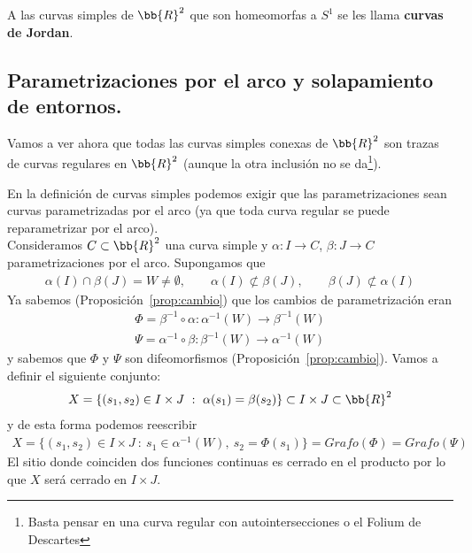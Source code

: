 \begin{definicion}
    A las curvas simples de $\bb{R}^2$ que son homeomorfas a $S^1$ se les llama \textbf{curvas de Jordan}.
\end{definicion}

\subsection{Parametrizaciones por el arco y solapamiento de entornos.}

Vamos a ver ahora que todas las curvas simples conexas de $\bb{R}^2$ son trazas de curvas regulares en $\bb{R}^2$ (aunque la otra inclusión no se da\footnote{Basta pensar en una curva regular con autointersecciones o el Folium de Descartes}).

\begin{observacion}
    En la definición de curvas simples podemos exigir que las parametrizaciones sean curvas parametrizadas por el arco (ya que toda curva regular se puede reparametrizar por el arco).\\

    Consideramos $C\subset \bb{R}^2$ una curva simple y $\alpha:I \to C$, $\beta: J \to C$ parametrizaciones por el arco. Supongamos que
    \begin{gather*}
        \alpha(I)\cap \beta(J)=W\neq \emptyset, \qquad \alpha(I)\not\subset\beta(J), \qquad \beta(J)\not\subset \alpha(I)
    \end{gather*}
    Ya sabemos (Proposición~\ref{prop:cambio}) que los cambios de parametrización eran
    \begin{gather*}
        \Phi = \beta^{-1} \circ \alpha : \alpha^{-1}(W) \to \beta^{-1}(W)\\
        \Psi = \alpha^{-1} \circ \beta : \beta^{-1}(W) \to \alpha^{-1}(W)
    \end{gather*}
    y sabemos que $\Phi$ y $\Psi$ son difeomorfismos (Proposición~\ref{prop:cambio}). Vamos a definir el siguiente conjunto:
    \begin{gather*}
        X=\{(s_1, s_2) \in I\times J \ : \ \alpha(s_1)=\beta(s_2)\} \subset I \times J \subset \bb{R}^2
    \end{gather*}
    y de esta forma podemos reescribir
    \begin{gather*}
        X=\{(s_1, s_2) \in I\times J \ : \ s_1 \in \alpha^{-1}(W), \ s_2 = \Phi(s_1)\} = Grafo(\Phi) = Grafo(\Psi) 
    \end{gather*}
    El sitio donde coinciden dos funciones continuas es cerrado en el producto por lo que $X$ será cerrado en $I\times J$.\\


\end{observacion}
